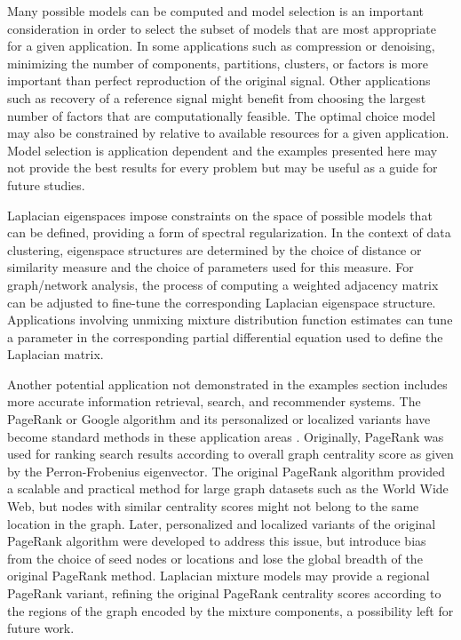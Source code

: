 \documentclass[10pt,letterpaper]{article}
\begin{document}
Many possible models can be computed and model selection is an important consideration in order to select the subset of models that are most appropriate for a given application.
In some applications such as compression or denoising, minimizing the number of components, partitions, clusters, or factors is more important than perfect reproduction of the original signal.
Other applications such as recovery of a reference signal might benefit from choosing the largest number of factors that are computationally feasible.
The optimal choice model may also be constrained by relative to available resources for a given application.
Model selection is application dependent and the examples presented here may not provide the best results for every problem but may be useful as a guide for future studies.

Laplacian eigenspaces impose constraints on the space of possible models that can be defined, providing a form of spectral regularization.
In the context of data clustering, eigenspace structures are determined by the choice of distance or similarity measure and the choice of parameters used for this measure.
For graph/network analysis, the process of computing a weighted adjacency matrix can be adjusted to fine-tune the corresponding Laplacian eigenspace structure.
Applications involving unmixing mixture distribution function estimates can tune a parameter in the corresponding partial differential equation used to define the Laplacian matrix.

Another potential application not demonstrated in the examples section includes more accurate information retrieval, search, and recommender systems.
The PageRank or Google algorithm and its personalized or localized variants have become standard methods in these application areas \cite{gleichpage}.
Originally, PageRank was used for ranking search results according to overall graph centrality score as given by the Perron-Frobenius eigenvector.
The original PageRank algorithm provided a scalable and practical method for large graph datasets such as the World Wide Web, but nodes with similar centrality scores might not belong to the same location in the graph.
Later, personalized and localized variants of the original PageRank algorithm were developed to address this issue, but introduce bias from the choice of seed nodes or locations and lose the global breadth of the original PageRank method.
Laplacian mixture models may provide a regional PageRank variant, refining the original PageRank centrality scores according to the regions of the graph encoded by the mixture components, a possibility left for future work.
\end{document}

